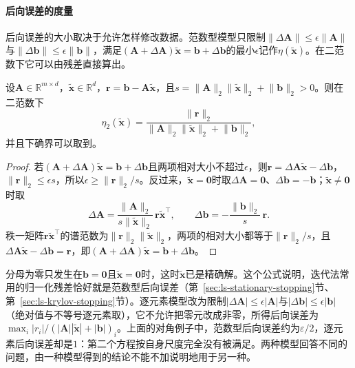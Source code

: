 \paragraph{后向误差的度量}
后向误差的大小取决于允许怎样修改数据。范数型模型只限制$\lVert\Delta\bm A\rVert\leq\epsilon\lVert\bm A\rVert$与$\lVert\Delta\bm b\rVert\leq\epsilon\lVert\bm b\rVert$，满足$(\bm A+\Delta\bm A)\tilde{\bm x}=\bm b+\Delta\bm b$的最小$\epsilon$记作$\eta(\tilde{\bm x})$。在二范数下它可以由残差直接算出。

\begin{theorem}[范数型后向误差]
\label{thm:ls-backward-error-formulas}
设$\bm A\in\mathbb R^{m\times d}$，$\tilde{\bm x}\in\mathbb R^d$，$\bm r=\bm b-\bm A\tilde{\bm x}$，且$s=\lVert\bm A\rVert_2\lVert\tilde{\bm x}\rVert_2+\lVert\bm b\rVert_2>0$。则在二范数下
\[
 \eta_2(\tilde{\bm x})=\frac{\lVert\bm r\rVert_2}{\lVert\bm A\rVert_2\lVert\tilde{\bm x}\rVert_2+\lVert\bm b\rVert_2},
\]
并且下确界可以取到。
\end{theorem}
\begin{proof}
若$(\bm A+\Delta\bm A)\tilde{\bm x}=\bm b+\Delta\bm b$且两项相对大小不超过$\epsilon$，则$\bm r=\Delta\bm A\tilde{\bm x}-\Delta\bm b$，$\lVert\bm r\rVert_2\leq\epsilon s$，所以$\epsilon\geq\lVert\bm r\rVert_2/s$。反过来，$\tilde{\bm x}=\bm0$时取$\Delta\bm A=\bm0$、$\Delta\bm b=-\bm b$；$\tilde{\bm x}\ne\bm0$时取
\[
 \Delta\bm A=\frac{\lVert\bm A\rVert_2}{s\lVert\tilde{\bm x}\rVert_2}\,\bm r\tilde{\bm x}^\top,\qquad
 \Delta\bm b=-\frac{\lVert\bm b\rVert_2}{s}\,\bm r .
\]
秩一矩阵$\bm r\tilde{\bm x}^\top$的谱范数为$\lVert\bm r\rVert_2\lVert\tilde{\bm x}\rVert_2$，两项的相对大小都等于$\lVert\bm r\rVert_2/s$，且$\Delta\bm A\tilde{\bm x}-\Delta\bm b=\bm r$，即$(\bm A+\Delta\bm A)\tilde{\bm x}=\bm b+\Delta\bm b$。
\end{proof}

分母为零只发生在$\bm b=\bm0$且$\tilde{\bm x}=\bm0$时，这时$\tilde{\bm x}$已是精确解。这个公式说明，迭代法常用的归一化残差恰好就是范数型后向误差（第~\ref{sec:ls-stationary-stopping}节、第~\ref{sec:ls-krylov-stopping}节）。逐元素模型改为限制$|\Delta\bm A|\leq\epsilon|\bm A|$与$|\Delta\bm b|\leq\epsilon|\bm b|$（绝对值与不等号逐元素取），它不允许把零元改成非零，所得后向误差为$\max_i|r_i|/(|\bm A||\tilde{\bm x}|+|\bm b|)_i$。上面的对角例子中，范数型后向误差约为$\varepsilon/2$，逐元素后向误差却是$1$：第二个方程按自身尺度完全没有被满足。两种模型回答不同的问题，由一种模型得到的结论不能不加说明地用于另一种。

